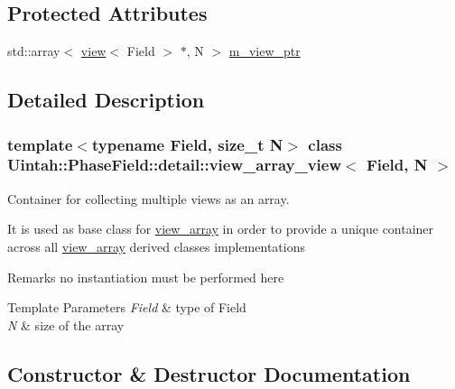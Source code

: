 \subsection*{Protected Attributes}
\begin{DoxyCompactItemize}
\item 
std\+::array$<$ \hyperlink{classUintah_1_1PhaseField_1_1detail_1_1view}{view}$<$ Field $>$ $\ast$, N $>$ \hyperlink{classUintah_1_1PhaseField_1_1detail_1_1view__array__view_a30d94983e4937efeb95483d926946d2e}{m\+\_\+view\+\_\+ptr}
\end{DoxyCompactItemize}


\subsection{Detailed Description}
\subsubsection*{template$<$typename Field, size\+\_\+t N$>$\newline
class Uintah\+::\+Phase\+Field\+::detail\+::view\+\_\+array\+\_\+view$<$ Field, N $>$}

Container for collecting multiple views as an array. 

It is used as base class for \hyperlink{classUintah_1_1PhaseField_1_1detail_1_1view__array}{view\+\_\+array} in order to provide a unique container across all \hyperlink{classUintah_1_1PhaseField_1_1detail_1_1view__array}{view\+\_\+array} derived classes implementations

\begin{DoxyRemark}{Remarks}
no instantiation must be performed here
\end{DoxyRemark}

\begin{DoxyTemplParams}{Template Parameters}
{\em Field} & type of Field \\
\hline
{\em N} & size of the array \\
\hline
\end{DoxyTemplParams}


\subsection{Constructor \& Destructor Documentation}
\mbox{\label{classUintah_1_1PhaseField_1_1detail_1_1view__array__view_a589b669c4891443b68b5fd0424f46c3d}} 
